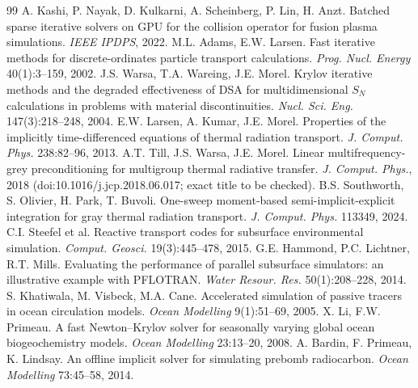 \documentclass[11pt,a4paper]{article}
\begin{document}
\begin{thebibliography}{99}
 A. Kashi, P. Nayak, D. Kulkarni, A. Scheinberg, P. Lin, H. Anzt. Batched sparse iterative solvers on GPU for the collision operator for fusion plasma simulations. \emph{IEEE IPDPS}, 2022.
 M.L. Adams, E.W. Larsen. Fast iterative methods for discrete-ordinates particle transport calculations. \emph{Prog. Nucl. Energy} 40(1):3--159, 2002.
 J.S. Warsa, T.A. Wareing, J.E. Morel. Krylov iterative methods and the degraded effectiveness of DSA for multidimensional $S_N$ calculations in problems with material discontinuities. \emph{Nucl. Sci. Eng.} 147(3):218--248, 2004.
 E.W. Larsen, A. Kumar, J.E. Morel. Properties of the implicitly time-differenced equations of thermal radiation transport. \emph{J. Comput. Phys.} 238:82--96, 2013.
 A.T. Till, J.S. Warsa, J.E. Morel. Linear multifrequency-grey preconditioning for multigroup thermal radiative transfer. \emph{J. Comput. Phys.}, 2018 (doi:10.1016/j.jcp.2018.06.017; exact title to be checked).
 B.S. Southworth, S. Olivier, H. Park, T. Buvoli. One-sweep moment-based semi-implicit-explicit integration for gray thermal radiation transport. \emph{J. Comput. Phys.} 113349, 2024.
 C.I. Steefel et al. Reactive transport codes for subsurface environmental simulation. \emph{Comput. Geosci.} 19(3):445--478, 2015.
 G.E. Hammond, P.C. Lichtner, R.T. Mills. Evaluating the performance of parallel subsurface simulators: an illustrative example with PFLOTRAN. \emph{Water Resour. Res.} 50(1):208--228, 2014.
 S. Khatiwala, M. Visbeck, M.A. Cane. Accelerated simulation of passive tracers in ocean circulation models. \emph{Ocean Modelling} 9(1):51--69, 2005.
 X. Li, F.W. Primeau. A fast Newton--Krylov solver for seasonally varying global ocean biogeochemistry models. \emph{Ocean Modelling} 23:13--20, 2008.
 A. Bardin, F. Primeau, K. Lindsay. An offline implicit solver for simulating prebomb radiocarbon. \emph{Ocean Modelling} 73:45--58, 2014.
\end{thebibliography}
\end{document}
